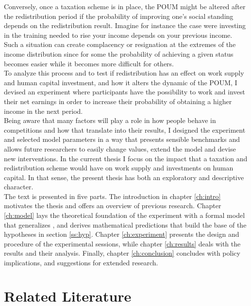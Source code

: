 Conversely, once a taxation scheme is in place, the POUM might be altered after the redistribution period if the probability of improving one's social standing depends on the redistribution result. Imagine for instance the case were investing in the training needed to rise your income depends on your previous income. Such a situation can create complacency or resignation at the extremes of the income distribution since for some the probability of achieving a given status becomes easier while it becomes more difficult for others.\\

To analyze this process and to test if redistribution has an effect on work supply and human capital investment, and how it alters the dynamic of the POUM, I devised an experiment where participants have the possibility to work and invest their net earnings in order to increase their probability of obtaining a higher income in the next period.\\

Being aware that many factors will play a role in how people behave in competitions and how that translate into their results, I designed the experiment and selected model parameters in a way that presents sensible benchmarks and allows future researchers to easily change values, extend the model and devise new interventions. In the current thesis I focus on the impact that a taxation and redistribution scheme would have on work supply and investments on human capital. In that sense, the present thesis has both an exploratory and descriptive character.\\ 

The text is presented in five parts. The introduction in chapter \ref{ch:intro} motivates the thesis and offers an overview of previous research. Chapter \ref{ch:model} lays the theoretical foundation of the experiment with a formal model that generalizes \cite{koch2017}, and derives mathematical predictions that build the base of the hypotheses in section \ref{ss:hyp}. Chapter \ref{ch:experiment} presents the design and procedure of the experimental sessions, while chapter \ref{ch:results} deals with the results and their analysis. Finally, chapter \ref{ch:conclusion} concludes with policy implications, and suggestions for extended research.\\

\section{Related Literature}

